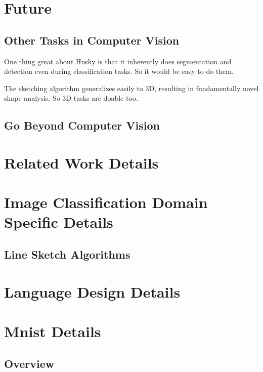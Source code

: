 \documentclass[11pt]{article} 	%
\theoremstyle{definition}
\begin{document}
\subsection{}


\section{Future}

\subsection{Other Tasks in Computer Vision}

One thing great about Husky is that it inherently does segmentation and detection even during classification tasks. So it would be easy to do them.

The sketching algorithm generalizes easily to 3D, resulting in fundamentally novel shape analysis. So 3D tasks are doable too.

\subsection{Go Beyond Computer Vision}

\appendix

\section{Related Work Details}

\section{Image Classification Domain Specific Details}

\subsection{Line Sketch Algorithms}


\section{Language Design Details}

\section{Mnist Details}

\subsection{Overview}
\end{document}
